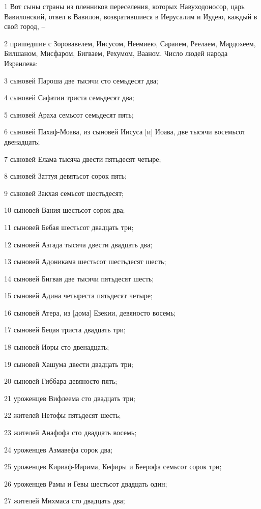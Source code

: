 \par 1 Вот сыны страны из пленников переселения, которых Навуходоносор, царь Вавилонский, отвел в Вавилон, возвратившиеся в Иерусалим и Иудею, каждый в свой город, --
\par 2 пришедшие с Зоровавелем, Иисусом, Неемиею, Сараием, Реелаем, Мардохеем, Билшаном, Мисфаром, Бигваем, Рехумом, Вааном. Число людей народа Израилева:
\par 3 сыновей Пароша две тысячи сто семьдесят два;
\par 4 сыновей Сафатии триста семьдесят два;
\par 5 сыновей Араха семьсот семьдесят пять;
\par 6 сыновей Пахаф-Моава, из сыновей Иисуса [и] Иоава, две тысячи восемьсот двенадцать;
\par 7 сыновей Елама тысяча двести пятьдесят четыре;
\par 8 сыновей Заттуя девятьсот сорок пять;
\par 9 сыновей Закхая семьсот шестьдесят;
\par 10 сыновей Вания шестьсот сорок два;
\par 11 сыновей Бебая шестьсот двадцать три;
\par 12 сыновей Азгада тысяча двести двадцать два;
\par 13 сыновей Адоникама шестьсот шестьдесят шесть;
\par 14 сыновей Бигвая две тысячи пятьдесят шесть;
\par 15 сыновей Адина четыреста пятьдесят четыре;
\par 16 сыновей Атера, из [дома] Езекии, девяносто восемь;
\par 17 сыновей Бецая триста двадцать три;
\par 18 сыновей Иоры сто двенадцать;
\par 19 сыновей Хашума двести двадцать три;
\par 20 сыновей Гиббара девяносто пять;
\par 21 уроженцев Вифлеема сто двадцать три;
\par 22 жителей Нетофы пятьдесят шесть;
\par 23 жителей Анафофа сто двадцать восемь;
\par 24 уроженцев Азмавефа сорок два;
\par 25 уроженцев Кириаф-Иарима, Кефиры и Беерофа семьсот сорок три;
\par 26 уроженцев Рамы и Гевы шестьсот двадцать один;
\par 27 жителей Михмаса сто двадцать два;
